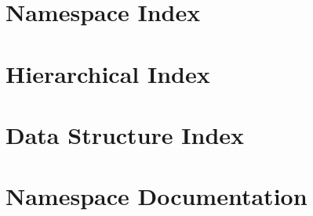 \documentclass[twoside]{book}
\newcommand{\+}{\discretionary{\mbox{\scriptsize$\hookleftarrow$}}{}{}}
\begin{document}
\chapter{Namespace Index}

\chapter{Hierarchical Index}

\chapter{Data Structure Index}

\chapter{Namespace Documentation}



\end{document}
